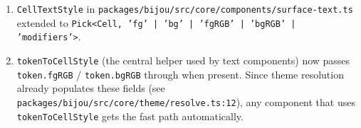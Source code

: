 \begin{enumerate}
\item
  \texttt{C\allowbreak{}e\allowbreak{}l\allowbreak{}l\allowbreak{}T\allowbreak{}e\allowbreak{}x\allowbreak{}t\allowbreak{}S\allowbreak{}t\allowbreak{}y\allowbreak{}l\allowbreak{}e} in \texttt{p\allowbreak{}a\allowbreak{}c\allowbreak{}k\allowbreak{}a\allowbreak{}g\allowbreak{}e\allowbreak{}s\allowbreak{}/\allowbreak{}b\allowbreak{}i\allowbreak{}j\allowbreak{}o\allowbreak{}u\allowbreak{}/\allowbreak{}s\allowbreak{}r\allowbreak{}c\allowbreak{}/\allowbreak{}c\allowbreak{}o\allowbreak{}r\allowbreak{}e\allowbreak{}/\allowbreak{}c\allowbreak{}o\allowbreak{}m\allowbreak{}p\allowbreak{}o\allowbreak{}n\allowbreak{}e\allowbreak{}n\allowbreak{}t\allowbreak{}s\allowbreak{}/\allowbreak{}s\allowbreak{}u\allowbreak{}r\allowbreak{}f\allowbreak{}a\allowbreak{}c\allowbreak{}e\allowbreak{}-\allowbreak{}t\allowbreak{}e\allowbreak{}x\allowbreak{}t\allowbreak{}.\allowbreak{}t\allowbreak{}s} extended to \texttt{P\allowbreak{}i\allowbreak{}c\allowbreak{}k\allowbreak{}<\allowbreak{}C\allowbreak{}e\allowbreak{}l\allowbreak{}l\allowbreak{},\allowbreak{} \allowbreak{}'\allowbreak{}f\allowbreak{}g\allowbreak{}'\allowbreak{} \allowbreak{}|\allowbreak{} \allowbreak{}'\allowbreak{}b\allowbreak{}g\allowbreak{}'\allowbreak{} \allowbreak{}|\allowbreak{} \allowbreak{}'\allowbreak{}f\allowbreak{}g\allowbreak{}R\allowbreak{}G\allowbreak{}B\allowbreak{}'\allowbreak{} \allowbreak{}|\allowbreak{} \allowbreak{}'\allowbreak{}b\allowbreak{}g\allowbreak{}R\allowbreak{}G\allowbreak{}B\allowbreak{}'\allowbreak{} \allowbreak{}|\allowbreak{} \allowbreak{}'\allowbreak{}m\allowbreak{}o\allowbreak{}d\allowbreak{}i\allowbreak{}f\allowbreak{}i\allowbreak{}e\allowbreak{}r\allowbreak{}s\allowbreak{}'\allowbreak{}>}.
\item
  \texttt{t\allowbreak{}o\allowbreak{}k\allowbreak{}e\allowbreak{}n\allowbreak{}T\allowbreak{}o\allowbreak{}C\allowbreak{}e\allowbreak{}l\allowbreak{}l\allowbreak{}S\allowbreak{}t\allowbreak{}y\allowbreak{}l\allowbreak{}e} (the central helper used by text components) now passes \texttt{t\allowbreak{}o\allowbreak{}k\allowbreak{}e\allowbreak{}n\allowbreak{}.\allowbreak{}f\allowbreak{}g\allowbreak{}R\allowbreak{}G\allowbreak{}B} / \texttt{t\allowbreak{}o\allowbreak{}k\allowbreak{}e\allowbreak{}n\allowbreak{}.\allowbreak{}b\allowbreak{}g\allowbreak{}R\allowbreak{}G\allowbreak{}B} through when present. Since theme resolution already populates these fields (see \texttt{p\allowbreak{}a\allowbreak{}c\allowbreak{}k\allowbreak{}a\allowbreak{}g\allowbreak{}e\allowbreak{}s\allowbreak{}/\allowbreak{}b\allowbreak{}i\allowbreak{}j\allowbreak{}o\allowbreak{}u\allowbreak{}/\allowbreak{}s\allowbreak{}r\allowbreak{}c\allowbreak{}/\allowbreak{}c\allowbreak{}o\allowbreak{}r\allowbreak{}e\allowbreak{}/\allowbreak{}t\allowbreak{}h\allowbreak{}e\allowbreak{}m\allowbreak{}e\allowbreak{}/\allowbreak{}r\allowbreak{}e\allowbreak{}s\allowbreak{}o\allowbreak{}l\allowbreak{}v\allowbreak{}e\allowbreak{}.\allowbreak{}t\allowbreak{}s\allowbreak{}:\allowbreak{}1\allowbreak{}2}), any component that uses \texttt{t\allowbreak{}o\allowbreak{}k\allowbreak{}e\allowbreak{}n\allowbreak{}T\allowbreak{}o\allowbreak{}C\allowbreak{}e\allowbreak{}l\allowbreak{}l\allowbreak{}S\allowbreak{}t\allowbreak{}y\allowbreak{}l\allowbreak{}e} gets the fast path automatically.

\end{enumerate}
